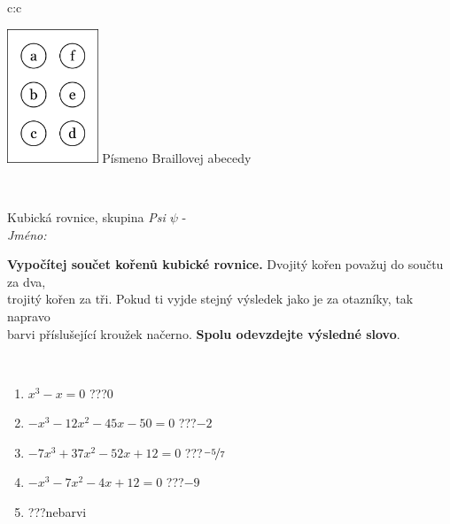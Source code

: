 \documentclass[10pt]{report}
\begin{document}
\begin{tabular}{c:c}
\begin{minipage}[c][104.5mm][t]{0.5\linewidth}
\begin{center}
\begin{minipage}{0.20\linewidth}
\begin{center}
\includegraphics[height=40mm]{../images/braille.png}
{\small Písmeno Braillovej abecedy}
\end{center}
\end{minipage}
\end{center}
\end{minipage}
\\ \hdashline
\begin{minipage}[c][104.5mm][t]{0.5\linewidth}
\begin{center}
\vspace{7mm}
{\huge Kubická rovnice, skupina \textit{Psi $\psi$} -}\\[5mm]
\textit{Jméno:}\phantom{xxxxxxxxxxxxxxxxxxxxxxxxxxxxxxxxxxxxxxxxxxxxxxxxxxxxxxxxxxxxxxxxx}\\[5mm]
\begin{minipage}{0.95\linewidth}
\begin{center}
\textbf{Vypočítej součet kořenů kubické rovnice.} Dvojitý kořen považuj do součtu za dva,\\trojitý kořen za tři. Pokud ti vyjde stejný výsledek jako je za otazníky, tak napravo\\barvi příslušející kroužek načerno. \textbf{Spolu odevzdejte výsledné slovo}.
\end{center}
\end{minipage}
\\[1mm]
\begin{minipage}{0.79\linewidth}
\begin{center}
\begin{varwidth}{\linewidth}
\begin{enumerate}
\Large
\item $x^3-x=0$\quad \dotfill\; ???\;\dotfill \quad $0$
\item $-x^3-12x^2-45x-50=0$\quad \dotfill\; ???\;\dotfill \quad $-2$
\item $-7x^3+37x^2-52x+12=0$\quad \dotfill\; ???\;\dotfill \quad $\nicefrac{-5}{7}$
\item $-x^3-7x^2-4x+12=0$\quad \dotfill\; ???\;\dotfill \quad $-9$
\item \quad \dotfill\; ???\;\dotfill \quad nebarvi

\end{enumerate}
\end{varwidth}
\end{center}
\end{minipage}
\end{center}
\end{minipage}
\end{tabular}
\end{document}
